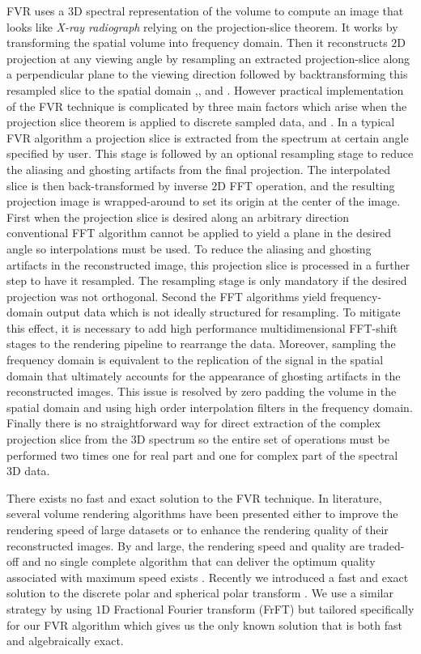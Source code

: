 \documentclass{UCF_ETD}
\begin{document}
FVR uses a $3$D spectral representation of the volume to compute an image that looks like \emph{X-ray radiograph} relying on the projection-slice theorem. It works by transforming the spatial volume into frequency domain. Then it reconstructs $2$D projection at any viewing angle by resampling an extracted projection-slice along a perpendicular plane to the viewing direction followed by backtransforming this resampled slice to the spatial domain \cite{Malzbender1993},\cite{Dunne1992},\cite{Marwan2014} and \cite{Marwan2015}. However practical implementation of the FVR technique is complicated by three main factors which arise when the projection slice theorem is applied to discrete sampled data, \cite{Dunne1992} and \cite{Marwan2015}. 
In a typical FVR algorithm a projection slice is extracted from the spectrum at certain angle specified by user. This stage is followed by an optional resampling stage to reduce the aliasing and ghosting artifacts from the final projection. The interpolated slice is then back-transformed by inverse $2$D FFT operation, and the resulting projection image is wrapped-around to set its origin at the center of the image.
First when the projection slice is desired along an arbitrary direction conventional FFT algorithm cannot be applied to yield a plane in the desired angle so interpolations must be used. To reduce the aliasing and ghosting artifacts in the reconstructed image, this projection slice is processed in a further step to have it resampled. The resampling stage is only mandatory if the desired projection was not orthogonal. Second  the FFT algorithms yield frequency-domain output data which is not ideally structured for resampling. To mitigate this effect, it is necessary to add high performance multidimensional FFT-shift stages to the rendering pipeline to rearrange the data. Moreover, sampling the frequency domain is equivalent to the replication of the signal in the spatial domain that ultimately accounts for the appearance of ghosting artifacts in the reconstructed images. This issue is resolved by zero padding the volume in the spatial domain and using high order interpolation filters in the frequency domain. Finally there is no straightforward way for direct extraction of the complex projection slice from the 3D spectrum \cite{Marwan2012} so the entire set of operations must be performed two times one for real part and one for complex part of the spectral 3D data. 

There exists no fast and exact solution to the FVR technique. In literature, several volume rendering algorithms have been presented
either to improve the rendering speed of large datasets or to enhance the rendering quality of their reconstructed
images. By and large, the rendering speed and quality are traded-off and no single complete algorithm that can deliver
the optimum quality associated with maximum speed exists \cite{Hansen2011}. Recently we introduced a fast and exact solution to the discrete polar and spherical polar transform \cite{Alam2015}. We use a similar strategy by using $1$D Fractional Fourier transform (FrFT) but tailored specifically for our FVR algorithm which gives us the only known solution that is both fast and algebraically exact. 
\end{document}

